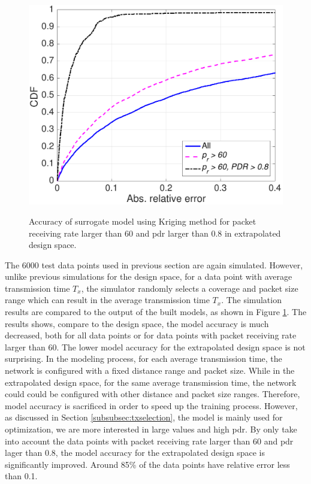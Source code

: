  
 \begin{figure}[t]
    \centering
{\includegraphics[width=0.8\columnwidth]{figures/Extend_constraint_09}}
  \caption{Accuracy of surrogate model using Kriging method for packet receiving rate larger than 60 and \gls{pdr} larger than 0.8 in extrapolated design space. \label{fig:cdf_constraint_extended}}
\end{figure}
 
The 6000 test data points used in previous section are again simulated. However, unlike previous simulations for the design space, for a data point with average transmission time $T_x$, the simulator randomly selects a  coverage and packet size range which can result in the average transmission time $T_x$. The simulation results are compared to the output of the built models, as shown in Figure \ref{fig:cdf_constraint_extended}. The results shows, compare to the design space, the model accuracy is much decreased,  both for all data points or for data points with packet receiving rate larger than 60. The lower model accuracy for the extrapolated design space is not surprising. In the modeling process, for each average transmission time, the network is configured with a fixed distance range and packet size. While in the extrapolated design space, for the same average transmission time, the network could could be configured with other distance  and packet size ranges. Therefore, model accuracy is sacrificed in order to speed up the training process. However, as discussed in Section \ref{subsubsec:txselection}, the model is mainly used for optimization, we are more interested in large values and high \gls{pdr}. By only take into account the data points with packet receiving rate larger than 60 and \gls{pdr} lager than 0.8, the model accuracy for the extrapolated design space is significantly improved. Around 85\% of the data points have relative error less than 0.1. 

